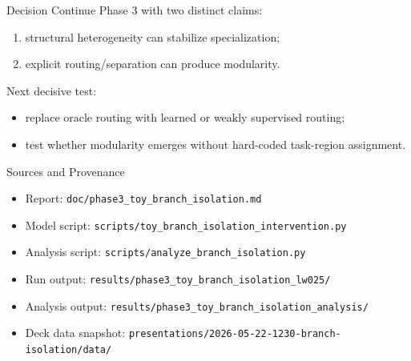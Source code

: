 \documentclass[aspectratio=169]{beamer}
\begin{document}
\begin{frame}{Decision}
  Continue Phase 3 with two distinct claims:
  \begin{enumerate}
    \item structural heterogeneity can stabilize specialization;
    \item explicit routing/separation can produce modularity.
  \end{enumerate}

  \vspace{0.8em}
  Next decisive test:
  \begin{itemize}
    \item replace oracle routing with learned or weakly supervised routing;
    \item test whether modularity emerges without hard-coded task-region assignment.
  \end{itemize}
\end{frame}

\begin{frame}{Sources and Provenance}
  \scriptsize
  \begin{itemize}
    \item Report: \texttt{doc/phase3\_toy\_branch\_isolation.md}
    \item Model script: \texttt{scripts/toy\_branch\_isolation\_intervention.py}
    \item Analysis script: \texttt{scripts/analyze\_branch\_isolation.py}
    \item Run output: \texttt{results/phase3\_toy\_branch\_isolation\_lw025/}
    \item Analysis output: \texttt{results/phase3\_toy\_branch\_isolation\_analysis/}
    \item Deck data snapshot: \texttt{presentations/2026-05-22-1230-branch-isolation/data/}
  \end{itemize}
\end{frame}
\end{document}
